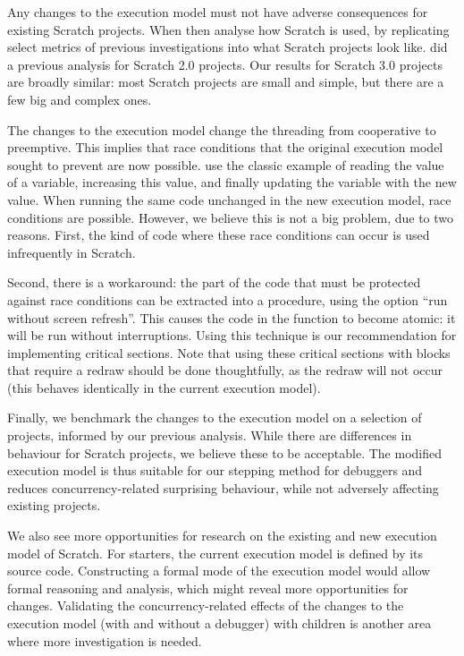 \documentclass[../main]{subfiles}
\begin{document}
Any changes to the execution model must not have adverse consequences for existing Scratch projects.
When then analyse how Scratch is used, by replicating select metrics of previous investigations into what Scratch projects look like.
\Textcite{aivaloglouHowKidsCode2016} did a previous analysis for Scratch 2.0 projects.
Our results for Scratch 3.0 projects are broadly similar: most Scratch projects are small and simple, but there are a few big and complex ones.

The changes to the execution model change the threading from cooperative to preemptive.
This implies that race conditions that the original execution model sought to prevent are now possible.
\Textcite{maloneyScratchProgrammingLanguage2010} use the classic example of reading the value of a variable, increasing this value, and finally updating the variable with the new value.
When running the same code unchanged in the new execution model, race conditions are possible.
However, we believe this is not a big problem, due to two reasons.
First, the kind of code where these race conditions can occur is used infrequently in Scratch.

Second, there is a workaround: the part of the code that must be protected against race conditions can be extracted into a procedure, using the option ``run without screen refresh''.
This causes the code in the function to become atomic: it will be run without interruptions.
Using this technique is our recommendation for implementing critical sections.
Note that using these critical sections with blocks that require a redraw should be done thoughtfully, as the redraw will not occur (this behaves identically in the current execution model).

Finally, we benchmark the changes to the execution model on a selection of projects, informed by our previous analysis.
While there are differences in behaviour for Scratch projects, we believe these to be acceptable.
The modified execution model is thus suitable for our stepping method for debuggers and reduces concurrency-related surprising behaviour, while not adversely affecting existing projects.

We also see more opportunities for research on the existing and new execution model of Scratch.
For starters, the current execution model is defined by its source code.
Constructing a formal mode of the execution model would allow formal reasoning and analysis, which might reveal more opportunities for changes.
Validating the concurrency-related effects of the changes to the execution model (with and without a debugger) with children is another area where more investigation is needed.
\end{document}
